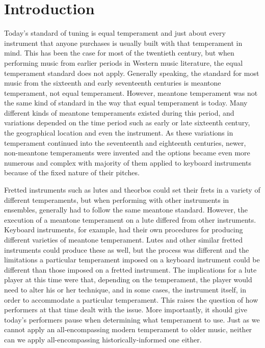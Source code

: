 \chapter*{Introduction}

Today's standard of tuning is equal temperament and just about every instrument that
anyone purchases is usually built with that temperament in mind.  This has been the
case for most of the twentieth century, but when performing music from earlier periods
in Western music literature, the equal temperament standard does not apply.  Generally
speaking, the standard for most music from the sixteenth and early seventeenth
centuries is meantone temperament, not equal temperament. However, meantone temperament
was not the same kind of standard in the way that equal temperament is today.  Many
different kinds of meantone temperaments existed during this period, and variations
depended on the time period such as early or late sixteenth century, the geographical
location and even the instrument.  As these variations in temperament continued into
the seventeenth and eighteenth centuries, newer, non-meantone temperaments were
invented and the options became even more numerous and complex with majority of them
applied to keyboard instruments because of the fixed nature of their pitches.

Fretted instruments such as lutes and theorbos could set their frets in a
variety of different temperaments, but when performing with other instruments in
ensembles, generally had to follow the same meantone standard.  However, the
execution of a meantone temperament on a lute differed from other instruments.
Keyboard instruments, for example, had their own procedures for producing
different varieties of meantone temperament.  Lutes and other similar fretted
instruments could produce these as well, but the process was different and the
limitations a particular temperament imposed on a keyboard instrument could be
different than those imposed on a fretted instrument.  The implications for a
lute player at this time were that, depending on the temperament, the player
would need to alter his or her technique, and in some cases, the instrument
itself, in order to accommodate a particular temperament. This raises the
question of how performers at that time dealt with the issue.  More importantly,
it should give today's performers pause when determining what temperament to
use.  Just as we cannot apply an all-encompassing modern temperament to older
music, neither can we apply all-encompassing historically-informed one either.

